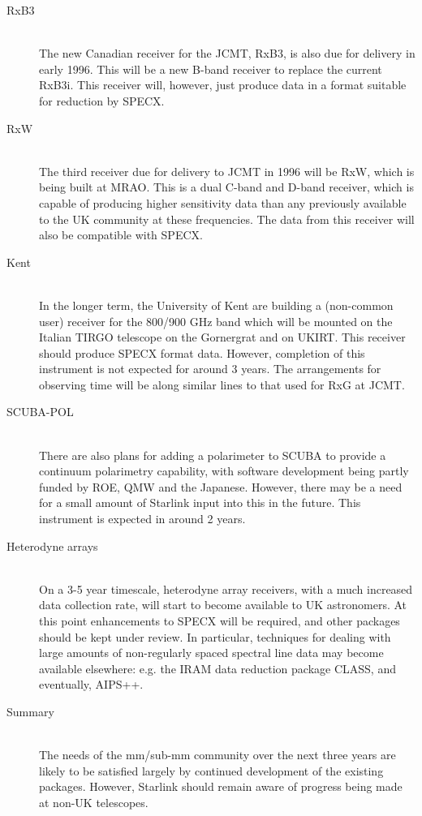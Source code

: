 \begin{description}
\begin{description}
\item[RxB3]\mbox{}\\
The new Canadian receiver for the JCMT, RxB3, is also due for delivery
in early 1996. This will be a new B-band receiver to replace the
current RxB3i. This receiver will, however, just produce data in a
format suitable for reduction by SPECX.

\item[RxW]\mbox{}\\
The third receiver due for delivery to JCMT in 1996 will be RxW, which
is being built at MRAO. This is a dual C-band and D-band receiver,
which is capable of producing higher sensitivity data than any
previously available to the UK community at these frequencies. The
data from this receiver will also be compatible with SPECX.

\item[Kent]\mbox{}\\
In the longer term, the University of Kent are building a (non-common
user) receiver for the 800/900 GHz band which will be mounted on the
Italian TIRGO telescope on the Gornergrat and on UKIRT. This receiver
should produce SPECX format data. However, completion of this
instrument is not expected for around 3 years. The arrangements for
observing time will be along similar lines to that used for RxG at
JCMT.

\item[SCUBA-POL]\mbox{}\\
There are also plans for adding a polarimeter to SCUBA to provide a
continuum polarimetry capability, with software development being
partly funded by ROE, QMW and the Japanese. However, there may be a
need for a small amount of Starlink input into this in the
future. This instrument is expected in around 2 years.

\item[Heterodyne arrays]\mbox{}\\
On a 3-5 year timescale, heterodyne array receivers, with a much
increased data collection rate, will start to become available to UK
astronomers. At this point enhancements to SPECX will be required, and
other packages should be kept under review. In particular, techniques
for dealing with large amounts of non-regularly spaced spectral line
data may become available elsewhere: e.g. the IRAM data reduction
package CLASS, and eventually, AIPS++.

\item[Summary]\mbox{}\\
The needs of the mm/sub-mm community over the next three years are
likely to be satisfied largely by continued development of the
existing packages. However, Starlink should remain aware of progress
being made at non-UK telescopes.

\end{description}
\end{description}

